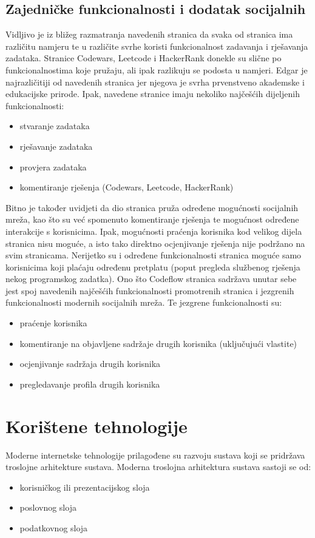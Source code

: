 \documentclass[times, utf8, zavrsni]{fer}
\begin{document}
		\section{Zajedničke funkcionalnosti i dodatak socijalnih}
		Vidljivo je iz bližeg razmatranja navedenih stranica da svaka od stranica ima različitu namjeru te u različite svrhe koristi funkcionalnost zadavanja i rješavanja zadataka. Stranice Codewars, Leetcode i HackerRank donekle su slične po funkcionalnostima koje pružaju, ali ipak razlikuju se podosta u namjeri. Edgar je najrazličitiji od navedenih stranica jer njegova je svrha prvenstveno akademske i edukacijske prirode. Ipak, navedene stranice imaju nekoliko najčešćih dijeljenih funkcionalnosti:
		\begin{itemize}
			\item stvaranje zadataka
			\item rješavanje zadataka
			\item provjera zadataka
			\item komentiranje rješenja (Codewars, Leetcode, HackerRank)
		\end{itemize}
		Bitno je također uvidjeti da dio stranica pruža određene mogućnosti socijalnih mreža, kao što su već spomenuto komentiranje rješenja te mogućnost određene interakcije s korisnicima. Ipak, mogućnosti praćenja korisnika kod velikog dijela stranica nisu moguće, a isto tako direktno ocjenjivanje rješenja nije podržano na svim stranicama. Nerijetko su i određene funkcionalnosti stranica moguće samo korisnicima koji plaćaju određenu pretplatu (poput pregleda službenog rješenja nekog programskog zadatka).
		Ono što Codeflow stranica sadržava unutar sebe jest spoj navedenih najčešćih funkcionalnosti promotrenih stranica i jezgrenih funkcionalnosti modernih socijalnih mreža. Te jezgrene funkcionalnosti su:
		\begin{itemize}
			\item praćenje korisnika
			\item komentiranje na objavljene sadržaje drugih korisnika (uključujući vlastite)
			\item ocjenjivanje sadržaja drugih korisnika
			\item pregledavanje profila drugih korisnika
		\end{itemize}
	
	
	\chapter{Korištene tehnologije}
	Moderne internetske tehnologije prilagođene su razvoju sustava koji se pridržava troslojne arhitekture sustava. Moderna troslojna arhitektura sustava sastoji se od:
	\begin{itemize}
		\item korisničkog ili prezentacijskog sloja
		\item poslovnog sloja
		\item podatkovnog sloja
	\end{itemize}
	
\end{document}
